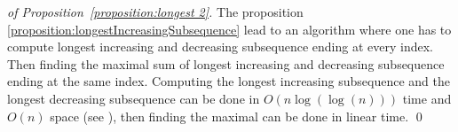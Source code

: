 \documentclass[a4paper]{llncs}
\newcounter{num}
\begin{document}
\bigskip

\begin{proof}[of Proposition~\ref{proposition:longest 2}]
The proposition \ref{proposition:longestIncreasingSubsequence} lead to an algorithm
where one has to compute longest increasing and decreasing subsequence ending at every index. Then finding the maximal sum of longest increasing and decreasing subsequence ending at the same index.
Computing the longest increasing subsequence and the longest decreasing subsequence can be done in 
$O(n\log(\log(n)))$ time and $O(n)$ space 
(see \cite{Bespamyatnikh00enumeratinglongest}), 
then finding the maximal can be done in linear time.
\qed
\end{proof}

\end{document}
